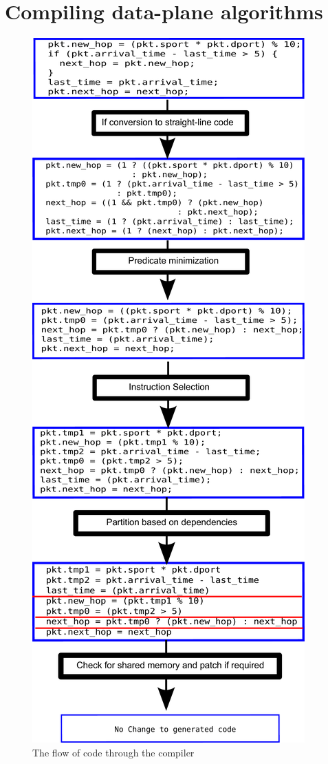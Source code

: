 \section{Compiling data-plane algorithms}
\label{s:compiler}

\begin{figure}
\includegraphics[width=\columnwidth]{compiler_flow.pdf}
\caption{The flow of code through the compiler}
\end{figure}

